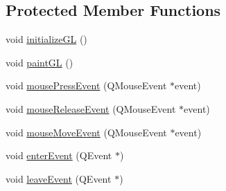 \subsection*{Protected Member Functions}
\begin{DoxyCompactItemize}
\item 
void \mbox{\hyperlink{class_image_open_g_l_widget_a0ee0a04058d97ccf201d5bda36e42e96}{initialize\+GL}} ()
\item 
void \mbox{\hyperlink{class_image_open_g_l_widget_a13c5d40cf7b52ff5ef13cd86475c9800}{paint\+GL}} ()
\item 
void \mbox{\hyperlink{class_image_open_g_l_widget_a96a4d8310e628c1ef7d1d1616f9161c8}{mouse\+Press\+Event}} (Q\+Mouse\+Event $\ast$event)
\item 
void \mbox{\hyperlink{class_image_open_g_l_widget_af77205be650a03c589cfeb5cfa3945f1}{mouse\+Release\+Event}} (Q\+Mouse\+Event $\ast$event)
\item 
void \mbox{\hyperlink{class_image_open_g_l_widget_aaee9c377ff4d9fa3f9811da857d04ea5}{mouse\+Move\+Event}} (Q\+Mouse\+Event $\ast$event)
\item 
void \mbox{\hyperlink{class_image_open_g_l_widget_a0eb921a06eb622b7cc13ce40c935b1e7}{enter\+Event}} (Q\+Event $\ast$)
\item 
void \mbox{\hyperlink{class_image_open_g_l_widget_ab92a330665a31c7dc8216d5f4af01f93}{leave\+Event}} (Q\+Event $\ast$)
\end{DoxyCompactItemize}
